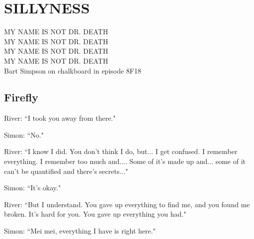 \chapter{\texorpdfstring{SILLYNESS}{}} %
\setcounter{equation}{0} 

\noindent
MY NAME IS NOT DR. DEATH\\
MY NAME IS NOT DR. DEATH\\
MY NAME IS NOT DR. DEATH\\
MY NAME IS NOT DR. DEATH\\

	Bart Simpson on chalkboard in episode 8F18

\section{Firefly}
River: ``I took you away from there."

Simon: ``No."

River: ``I know I did. You don't think I do, but... I get confused. I remember
everything. I remember too much and.... Some of it's made up and... some of
it can't be quantified and there's secrets..."

Simon: ``It's okay."

River: ``But I understand. You gave up everything to find me, and you found me
broken. It's hard for you. You gave up everything you had."

Simon: ``Mei mei, everything I have is right here."
